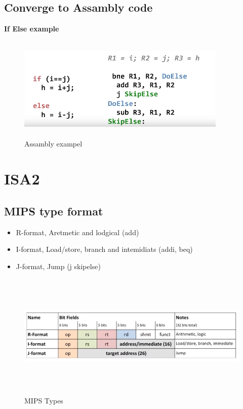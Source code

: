 \subsection{Converge to Assambly code}
\noindent\textbf{If Else example} \newline
\begin{figure}[h]
    \vspace{10mm}
    \centering
    \includegraphics[width=10cm, height=5cm]{image/assambly-exampel.png} 
    \caption{Assambly exampel}
    \label{Assambly-exampel}
\end{figure}

\section{ISA2}
\subsection{MIPS type format}
\begin{itemize}
\item  R-format, Aretmetic and lodgical (add)
\item  I-format, Load/store, branch and intemidiats (addi, beq)
\item  J-format, Jump (j skipelse) 
\end{itemize}

\begin{figure}[h]
    \vspace{10mm}
    \centering
    \includegraphics[width=17cm, height=6cm]{image/mips-types.png} 
    \caption{MIPS Types}
    \label{MIPS-Types}
\end{figure}

